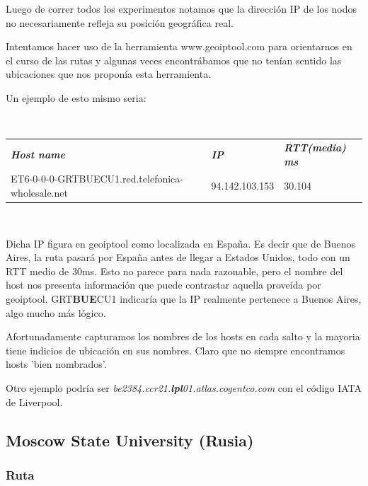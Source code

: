 Luego de correr todos los experimentos notamos que la direcci\'on IP de los nodos
no necesariamente refleja su posici\'on geogr\'afica real.

Intentamos hacer uso de la herramienta www.geoiptool.com para orientarnos en 
el curso de las rutas y algunas veces encontr\'abamos que no ten\'ian sentido las 
ubicaciones que nos propon\'ia esta herramienta.

Un ejemplo de esto mismo seria:

~

\begin{tabular}{lll}
	\textit{\textbf{Host name}}	&	\textit{\textbf{IP}}	&	\textit{\textbf{RTT(media) ms}}	\\
	ET6-0-0-0-GRTBUECU1.red.telefonica-wholesale.net	&	94.142.103.153	&	30.104	\\
\end{tabular}

~

Dicha IP figura en geoiptool como localizada en España. Es decir que de Buenos Aires, la ruta pasar\'a por España antes de llegar a Estados Unidos,
todo con un RTT medio de 30ms. Esto no parece para nada razonable, pero el nombre del host nos presenta informaci\'on que puede contrastar aquella 
prove\'ida por geoiptool. GRT\textbf{BUE}CU1 indicar\'ia que la IP realmente pertenece a Buenos Aires, algo mucho m\'as l\'ogico.

Afortunadamente capturamos los nombres de los hosts en cada salto y la mayoria tiene indicios de ubicaci\'on en sus
nombres. Claro que no siempre encontramos hosts 'bien nombrados'.

Otro ejemplo podr\'ia ser \emph{be2384.ccr21.\textbf{lpl}01.atlas.cogentco.com} con el c\'odigo IATA de 
Liverpool.

\subsection{Moscow State University (Rusia)}

\subsubsection{Ruta}

~

